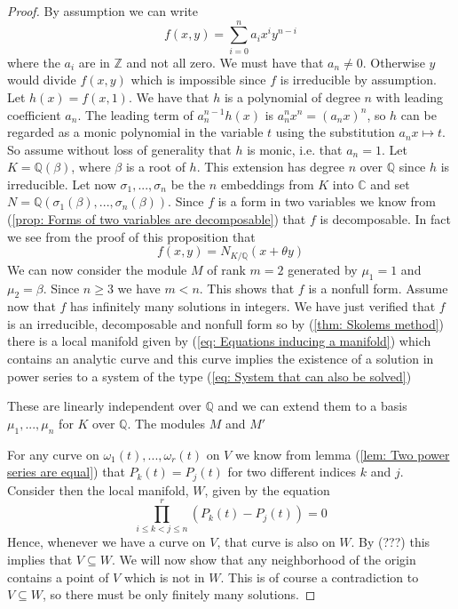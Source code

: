 \documentclass{article}
\newcommand{\mbb}[1]{\mathbb{#1}}
\begin{document}
\begin{proof}
    By assumption we can write 
    $$f(x,y) = \sum_{i = 0}^n a_i x^{i} y^{n-i}$$
    where the $a_i$ are in $\mbb Z$ and not all zero. We must have that $a_n \neq 0$. Otherwise $y$ would divide $f(x,y)$ which is impossible since $f$ is irreducible by assumption. Let $h(x) = f(x,1)$. We have that $h$ is a polynomial of degree $n$ with leading coefficient $a_n$. The leading term of $a_n^{n-1} h(x)$ is $a_n^nx^n = (a_n x)^n$, so $h$ can be regarded as a monic polynomial in the variable $t$ using the substitution $a_n x \mapsto t$. So assume without loss of generality that $h$ is monic, i.e. that $a_n = 1$. Let $K = \mbb Q(\beta)$, where $\beta$ is a root of $h$. This extension has degree $n$ over $\mbb Q$ since $h$ is irreducible. Let now $\sigma_1, ..., \sigma_n$ be the $n$ embeddings from $K$ into $\mbb C$ and set $N = \mbb Q(\sigma_1(\beta), ..., \sigma_n(\beta))$. Since $f$ is a form in two variables we know from (\ref{prop: Forms of two variables are decomposable}) that $f$ is decomposable. In fact we see from the proof of this proposition that
    $$f(x, y) = N_{K / \mbb Q}(x + \theta y)$$
    We can now consider the module $M$ of rank $m = 2$ generated by $\mu_1 = 1$ and $\mu_2 = \beta$. Since $n \geq 3$ we have $m < n$. This shows that $f$ is a nonfull form. Assume now that $f$ has infinitely many solutions in integers. We have just verified that $f$ is an irreducible, decomposable and nonfull form so by (\ref{thm: Skolems method}) there is a local manifold given by (\ref{eq: Equations inducing a manifold}) which contains an analytic curve and this curve implies the existence of a solution in power series to a system of the type (\ref{eq: System that can also be solved})
    
    These are linearly independent over $\mbb Q$ and we can extend them to a basis $\mu_1, ..., \mu_n$ for $K$ over $\mbb Q$. The modules $M$ and $M'$ 


    For any curve on $\omega_1(t), ..., \omega_r(t)$ on $V$ we know from lemma (\ref{lem: Two power series are equal}) that $P_k(t) = P_j(t)$ for two different indices $k$ and $j$. Consider then the local manifold, $W$, given by the equation
    $$\prod_{i \leq k < j \leq n}^r (P_k(t) - P_j(t)) = 0$$
    Hence, whenever we have a curve on $V$, that curve is also on $W$. By (???) this implies that $V \subseteq W$. We will now show that any neighborhood of the origin contains a point of $V$ which is not in $W$. This is of course a contradiction to $V \subseteq W$, so there must be only finitely many solutions. 

\end{proof}
\end{document}

